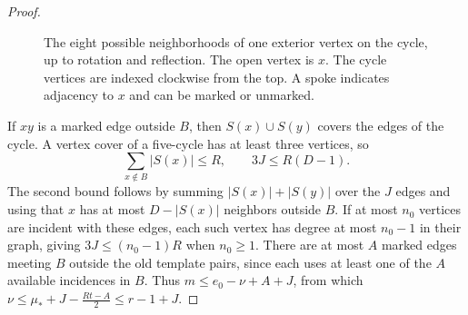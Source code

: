\documentclass[preprint,11pt,numbers]{elsarticle-arxiv}
\numberwithin{equation}{section}
\theoremstyle{definition}
\begin{document}
\begin{proof}
\begin{figure}[htbp]
\caption{The eight possible neighborhoods of one exterior vertex on the cycle, up to rotation and reflection. The open vertex is $x$. The cycle vertices are indexed clockwise from the top. A spoke indicates adjacency to $x$ and can be marked or unmarked.}
\label{fig:finite-simple-signatures}
\end{figure}

If $xy$ is a marked edge outside $B$, then $S(x)\cup S(y)$ covers
the edges of the cycle. A vertex cover of a five-cycle has at least
three vertices, so
\begin{equation}\label{eq:odd-interior-slots}
 \sum_{x\notin B}|S(x)|\leq R,\qquad 3J\leq R(D-1).
\end{equation}
The second bound follows by summing $|S(x)|+|S(y)|$ over the $J$
edges and using that $x$ has at most $D-|S(x)|$ neighbors outside $B$.
If at most $n_0$ vertices are incident with these edges, each such
vertex has degree at most $n_0-1$ in their graph, giving
$3J\leq(n_0-1)R$ when $n_0\geq1$. There are at most $A$ marked
edges meeting $B$ outside the old template pairs, since each uses
at least one of the $A$ available incidences in $B$. Thus
$m\leq e_0-\nu+A+J$, from which
$\nu\leq \mu_*+J-\frac{Rt-A}{2}\leq r-1+J$.


\end{proof}
\end{document}
